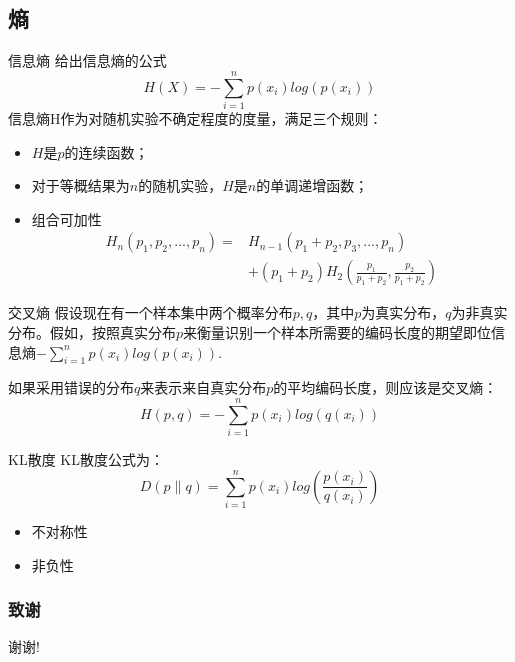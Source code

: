 \documentclass{ctexbeamer}
\begin{document}
\subsection{熵}
\begin{frame}{信息熵}
给出信息熵的公式
$$H(X)=-\sum_{i=1}^np(x_i)log(p(x_i))$$
信息熵H作为对随机实验不确定程度的度量，满足三个规则：
\begin{itemize}
\item $H$是$p$的连续函数；
\item 对于等概结果为$n$的随机实验，$H$是$n$的单调递增函数；
\item 组合可加性
\begin{equation*}
\begin{split}
H_n(p_1,p_2,...,p_n) =& H_{n-1}(p_1+p_2,p_3,...,p_n)\\
&+(p_1+p_2)H_2(\frac{p_1}{p_1+p_2},\frac{p_2}{p_1+p_2})
\end{split}
\end{equation*}

\end{itemize}
\end{frame}
\begin{frame}{交叉熵}
假设现在有一个样本集中两个概率分布$p,q$，其中$p$为真实分布，$q$为非真实分布。假如，按照真实分布$p$来衡量识别一个样本所需要的编码长度的期望即位信息熵$-\sum_{i=1}^np(x_i)log(p(x_i))$. 

如果采用错误的分布$q$来表示来自真实分布$p$的平均编码长度，则应该是交叉熵：
$$H(p,q)=-\sum_{i=1}^np(x_i)log(q(x_i))$$

\end{frame}

\begin{frame}{KL散度}
KL散度公式为：
$$D(p\|q) =  \sum_{i=1}^np(x_i)log(\frac{p(x_i)}{q(x_i)})$$
\begin{itemize}
\item 不对称性
\item 非负性
\end{itemize}

\end{frame}



\begin{frame}
  \frametitle{致谢}
  \centerline{\Large 谢谢!}
\end{frame}
\end{document}
